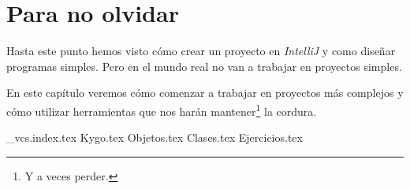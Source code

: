 \chapter{Para no olvidar}
  Hasta este punto hemos visto cómo crear un proyecto en \textit{IntelliJ} y como diseñar programas
  simples.
  Pero en el mundo real no van a trabajar en proyectos simples.
  
  En este capítulo veremos cómo comenzar a trabajar en proyectos más complejos y cómo utilizar
  herramientas que nos harán mantener\footnote{Y a veces perder.} la cordura.

  {_vcs.index.tex}
  {Kygo.tex}
  {Objetos.tex}
  {Clases.tex}
  {Ejercicios.tex}
  \nocite{*}
  \printbibliography[keyword=oop]

